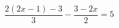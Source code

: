 \begin{ex}[type=equation]
	\begin{condition}
		$\dfrac{2(2x - 1) - 3}{3}-\dfrac{3 - 2x}{2} = 5$
	\end{condition}
\end{ex}